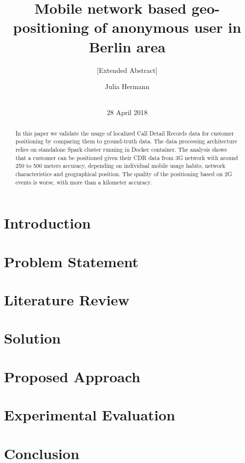 \documentclass{sig-alternate-05-2015}
\begin{document}
\title{Mobile network based geo-positioning of anonymous user in Berlin area}
\subtitle{[Extended Abstract]}

\author{
\alignauthor
Julia Hermann\\
       \\
}

\maketitle
\date{28 April 2018}
\begin{abstract}
In this paper we validate the usage of localized Call Detail Records data for customer positioning by comparing them to ground-truth data. The data processing architecture relies on standalone Spark cluster running in Docker container. The analysis shows that a customer can be positioned given their CDR data from 3G network with around 250 to 500 meters accuracy, depending on individual mobile usage habits, network characteristics and geographical position. The quality of the positioning based on 2G events is worse, with more than a kilometer accuracy.

\end{abstract}
\section{Introduction}
\section{Problem Statement}
\section{Literature Review}
\section{Solution}
\section{Proposed Approach}
\section{Experimental Evaluation}
\section{Conclusion}



\end{document}
